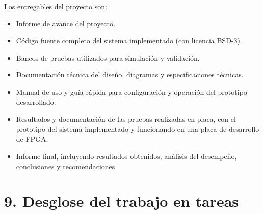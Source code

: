 \documentclass[
11pt, %
]{charter}
\begin{document}
Los entregables del proyecto son:

\begin{itemize}
	\item Informe de avance del proyecto.
	\item Código fuente completo del sistema implementado (con licencia BSD-3).
	\item Bancos de pruebas utilizados para simulación y validación.
	\item Documentación técnica del diseño, diagramas y especificaciones técnicas.
	\item Manual de uso y guía rápida para configuración y operación del prototipo desarrollado.
	\item Resultados y documentación de las pruebas realizadas en placa, con el prototipo del sistema implementado y funcionando en una placa de desarrollo de FPGA.
	\item Informe final, incluyendo resultados obtenidos, análisis del desempeño, conclusiones y recomendaciones.
\end{itemize}

\section{9. Desglose del trabajo en tareas}
\label{sec:wbs}
\end{document}
